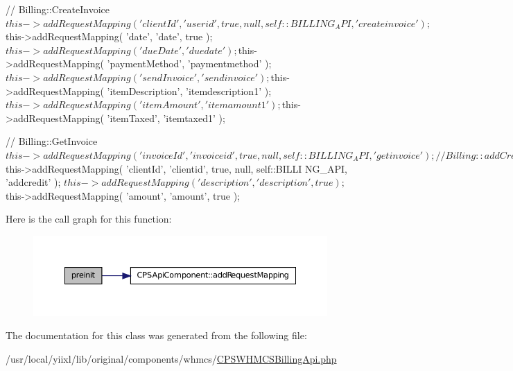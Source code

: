 \begin{DoxyCode}
{        //  Billing::CreateInvoice
        $this->addRequestMapping( 'clientId', 'userid', true, null, self::BILLING
      _API, 'createinvoice' );
        $this->addRequestMapping( 'date', 'date', true );
        $this->addRequestMapping( 'dueDate', 'duedate' );
        $this->addRequestMapping( 'paymentMethod', 'paymentmethod' );
        $this->addRequestMapping( 'sendInvoice', 'sendinvoice' );
        $this->addRequestMapping( 'itemDescription', 'itemdescription1' );
        $this->addRequestMapping( 'itemAmount', 'itemamount1' );
        $this->addRequestMapping( 'itemTaxed', 'itemtaxed1' );

        //  Billing::GetInvoice
        $this->addRequestMapping( 'invoiceId', 'invoiceid', true, null, self::BIL
      LING_API, 'getinvoice' );

        //  Billing::addCredit
        $this->addRequestMapping( 'clientId', 'clientid', true, null, self::BILLI
      NG_API, 'addcredit' );
        $this->addRequestMapping( 'description', 'description', true );
        $this->addRequestMapping( 'amount', 'amount', true );
    }
\end{DoxyCode}




Here is the call graph for this function:\nopagebreak
\begin{figure}[H]
\begin{center}
\leavevmode
\includegraphics[width=374pt]{classCPSWHMCSBillingApi_a2dc262e99b1c246b56f27626bfe699ff_cgraph}
\end{center}
\end{figure}




The documentation for this class was generated from the following file:\begin{DoxyCompactItemize}
\item 
/usr/local/yiixl/lib/original/components/whmcs/\hyperlink{CPSWHMCSBillingApi_8php}{CPSWHMCSBillingApi.php}\end{DoxyCompactItemize}
